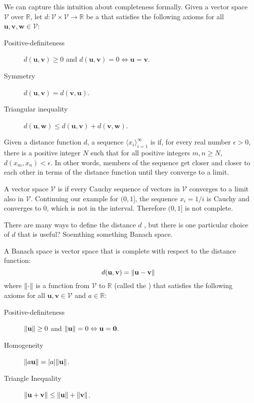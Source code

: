 We can capture this intuition about completeness formally. Given a vector space $\mathcal{V}$ over $\mathbb{R}$, let $d : \mathcal{V} \times \mathcal{V} \to \mathbb{R}$ be a  that satisfies the following axioms for all $\mathbf{u}, \mathbf{v}, \mathbf{w} \in \mathcal{V}$:
%
\begin{description}
  \item[Positive-definiteness] $d(\mathbf{u}, \mathbf{v}) \geq 0$ and $d(\mathbf{u}, \mathbf{v}) = 0 \Leftrightarrow \mathbf{u} = \mathbf{v}$.
  \item[Symmetry] $d(\mathbf{u}, \mathbf{v}) = d(\mathbf{v}, \mathbf{u})$.
  \item[Triangular inequality] $d(\mathbf{u}, \mathbf{w}) \leq d(\mathbf{u}, \mathbf{v}) + d(\mathbf{v}, \mathbf{w})$.
\end{description}
%
Given a distance function $d$, a sequence $\langle x_i \rangle_{i=1}^\infty$ is  if, for every real number $\epsilon > 0$, there is a positive integer $N$ such that for all positive integers $m, n \geq N$, $d(x_m, x_n) < \epsilon$. In other words, members of the sequence get closer and closer to each other in terms of the distance function until they converge to a limit.

A vector space $\mathcal{V}$ is  if every Cauchy sequence of vectors in $\mathcal{V}$ converges to a limit also in $\mathcal{V}$. Continuing our example for $(0, 1]$, the sequence $x_i = 1 / i$ is Cauchy and converges to $0$, which is not in the interval. Therefore $(0, 1]$ is not complete.

There are many ways to define the distance $d$ , but there is one particular choice of $d$ that is useful? Soemthing something Banach space.
%
\begin{definition}
A Banach space is vector space that is complete with respect to the distance function:
\begin{equation}
  d(\mathbf{u}, \mathbf{v}) = \lVert\mathbf{u} - \mathbf{v}\rVert
\end{equation}
where $\lVert\cdot\rVert$ is a function from $\mathcal{V}$ to $\mathbb{R}$ (called the ) that satisfies the following axioms for all $\mathbf{u}, \mathbf{v} \in \mathcal{V}$ and $a \in \mathbb{R}$:
\begin{description}
  \item[Positive-definiteness] $\lVert\mathbf{u}\rVert \geq 0$ and $\lVert\mathbf{u}\rVert = 0 \Leftrightarrow \mathbf{u} = \mathbf{0}$.
  \item[Homogeneity] $\lVert a \mathbf{u}\rVert = \lvert a\rvert \lVert\mathbf{u}\rVert$.
  \item[Triangle Inequality] $\lVert\mathbf{u} + \mathbf{v}\rVert \leq \lVert\mathbf{u}\rVert + \lVert\mathbf{v}\rVert$.
\end{description}
\end{definition}

